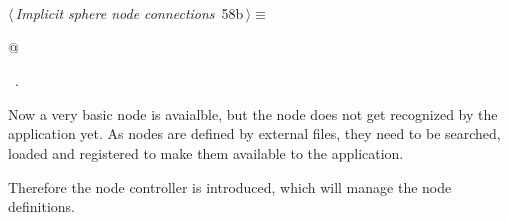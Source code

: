 \documentclass[
    a4paper,      %
    10pt,         %
    openright,    %
    notitlepage,  %
    parskip=half, %
]{scrreprt}       %
\theoremstyle{definition}                    %
\begin{document}
\begin{flushleft} \small
\begin{minipage}{\linewidth}\label{scrap96}\raggedright\small
{} $\langle\,${\itshape Implicit sphere node connections}\nobreak\ {\footnotesize {58b}}$\,\rangle\equiv$
\vspace{-1ex}
\begin{list}{}{} \item
\mbox{}@{\NWsep}
\end{list}
\vspace{-1.5ex}
\footnotesize
\begin{list}{}{\setlength{\itemsep}{-\parsep}\setlength{\itemindent}{-\leftmargin}}
\item \NWtxtMacroRefIn\ .

\item{}
\end{list}
\end{minipage}\vspace{4ex}
\end{flushleft}
Now a very basic node is avaialble, but the node does not get recognized by the
application yet. As nodes are defined by external files, they need to be
searched, loaded and registered to make them available to the application.

Therefore the node controller is introduced, which will manage the node
definitions.
\end{document}

